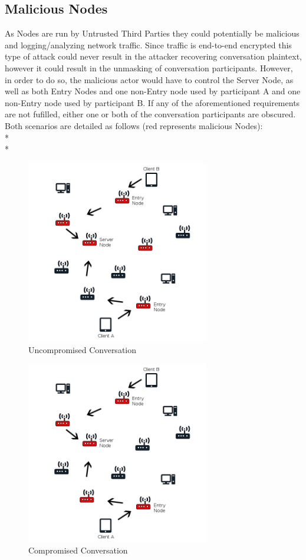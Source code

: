 \documentclass{article}
\begin{document}
\subsection{Malicious Nodes}
As Nodes are run by Untrusted Third Parties they could potentially be malicious and logging/analyzing network traffic. Since traffic is end-to-end encrypted this type of attack could never result in the attacker recovering conversation plaintext, however it could result in the unmasking of conversation participants. However, in order to do so, the malicious actor would have to control the Server Node, as well as both Entry Nodes and one non-Entry node used by participant A and one non-Entry node used by participant B. If any of the aforementioned requirements are not fufilled, either one or both of the conversation participants are obscured. Both scenarios are detailed as follows (red represents malicious Nodes):\\*\\*
\begin{figure}[h]
	\centering
  	\includegraphics[width=8cm,height=8cm,keepaspectratio]{img/UnCompromisedConversation.png}
	\caption{Uncompromised Conversation}
\end{figure}
\begin{figure}[h]
	\centering
  	\includegraphics[width=8cm,height=8cm,keepaspectratio]{img/CompromisedConversation.png}
	\caption{Compromised Conversation}
\end{figure}
\end{document}
